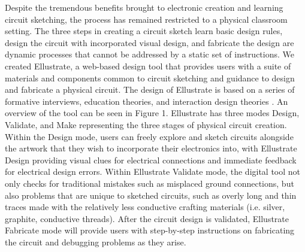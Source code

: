 \documentclass{sigchi}
\begin{document}
Despite the tremendous benefits brought to electronic creation and learning circuit sketching, the process has remained restricted to a physical classroom setting. 
The three steps in creating a circuit sketch \textendash learn basic design rules, design the circuit with incorporated visual design, and fabricate the design \textendash are dynamic processes that cannot be addressed by a static set of instructions. 
We created Ellustrate, a web-based design tool that provides users with a suite of materials and components common to circuit sketching and guidance to design and fabricate a physical circuit. 
The design of Ellustrate is based on a series of formative interviews, education theories, and interaction design theories . An overview of the tool can be seen in Figure 1. Ellustrate has three modes \textendash Design, Validate, and Make \textendash representing the three stages of physical circuit creation.  Within the Design mode, users can freely explore and sketch circuits alongside the artwork that they wish to incorporate their electronics into, with Ellustrate Design providing visual clues for electrical connections and immediate feedback for electrical design errors. Within Ellustrate Validate mode, the digital tool not only checks for traditional mistakes such as misplaced ground connections, but also problems that are unique to sketched circuits, such as overly long and thin traces made with the relatively less conductive crafting materials (i.e. silver, graphite, conductive threads). After the circuit design is validated, Ellustrate Fabricate mode will provide users with step-by-step instructions on fabricating the circuit and debugging problems as they arise. 

\end{document}
